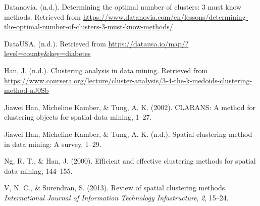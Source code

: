 \documentclass[12pt,twoside]{amherstthesis}
\begin{document}
  \hypertarget{refs}{}
  \hypertarget{ref-Rec7}{}
  Datanovia. (n.d.). Determining the optimal number of clusters: 3 must
  know methods. Retrieved from
  \url{https://www.datanovia.com/en/lessons/determining-the-optimal-number-of-clusters-3-must-know-methods/}
  
  \hypertarget{ref-data}{}
  DataUSA. (n.d.). Retrieved from
  \url{https://datausa.io/map/?level=county\&key=diabetes}
  
  \hypertarget{ref-Rec13}{}
  Han, J. (n.d.). Clustering analysis in data mining. Retrieved from
  \url{https://www.coursera.org/lecture/cluster-analysis/3-4-the-k-medoids-clustering-method-nJ0Sb}
  
  \hypertarget{ref-Rec3}{}
  Jiawei Han, Micheline Kamber, \& Tung, A. K. (2002). CLARANS: A method
  for clustering objects for spatial data mining, 1--27.
  
  \hypertarget{ref-Rec2}{}
  Jiawei Han, Micheline Kamber, \& Tung, A. K. (n.d.). Spatial clustering
  method in data mining: A survey, 1--29.
  
  \hypertarget{ref-Rec6}{}
  Ng, R. T., \& Han, J. (2000). Efficient and effective clustering methods
  for spatial data mining, 144--155.
  
  \hypertarget{ref-Rec5}{}
  V, N. C., \& Surendran, S. (2013). Review of spatial clustering methods.
  \emph{International Journal of Information Technology Infastructure},
  \emph{2}, 15--24.


\end{document}
